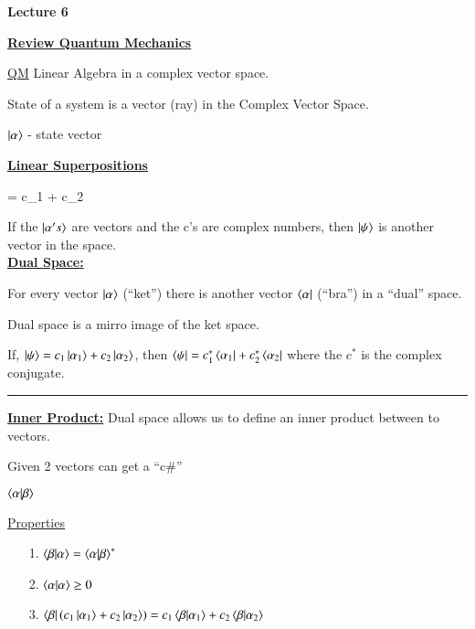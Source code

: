 
\usepackage{fancyhdr}

\fancyhf{}


\thispagestyle{fancy}

\begin{center}
{\huge \textbf{Lecture 6}}
\end{center}

{\fontsize{14}{16}\selectfont

\textbf{\underline{Review Quantum Mechanics}} 

\underline{QM} Linear Algebra in a complex vector space.

State of a system is a vector (ray) in the Complex Vector Space. 

\begin{center}
$\ket \alpha$  - state vector
\end{center}


\textbf{\underline{Linear Superpositions} }

\be
\ket \psi = c_1  + c_2 
\ee

If the $\ket{\alpha's}$ are vectors and the c's are complex numbers, then $\ket \psi$ is another vector in the space.\\


\textbf{\underline{Dual Space:}}

For every vector $\ket \alpha$ (``ket'') there is another vector $\bra \alpha$ (``bra'') in a ``dual'' space.

Dual space is a mirro image  of the ket space.


If, $\ket \psi = c_1 \ket{\alpha_1} + c_2 \ket{\alpha_2}$, then $\bra \psi = c_1^* \bra{\alpha_1} + c_2^* \bra{\alpha_2}$
where the $c^*$ is the complex conjugate.

\noindent\rule{\textwidth}{1pt}

\textbf{\underline{Inner Product:}} Dual space allows us to define an inner product between to vectors. 

Given 2 vectors can get a ``c\#'' 

$\braket{\alpha|\beta}$

\underline{Properties}
\begin{itemize}
\item[1.] $\braket{\beta|\alpha} = \braket{\alpha| \beta}^*$
\item[2.] $\braket{\alpha|\alpha} \geq 0$
\item[3.] $\bra{\beta} (c_1 \ket{\alpha_1} + c_2 \ket{\alpha_2} ) =  c_1 \braket{\beta|\alpha_1} + c_2 \braket{\beta| \alpha_2}$
\end{itemize}

}
